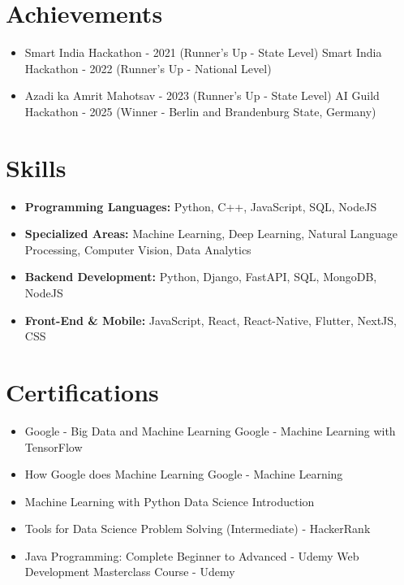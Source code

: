 \documentclass[a4paper,10pt]{article}
\begin{document}
\section*{Achievements}
\begin{itemize}
\item Smart India Hackathon - 2021 (Runner's Up - State Level) \hfill Smart India Hackathon - 2022 (Runner's Up - National Level)
\item Azadi ka Amrit Mahotsav - 2023 (Runner's Up - State Level) \hfill AI Guild Hackathon - 2025 (Winner - Berlin and Brandenburg State, Germany)
\end{itemize}

\section*{Skills}
\begin{itemize}
  \item \textbf{Programming Languages:} Python, C++, JavaScript, SQL, NodeJS
  \item \textbf{Specialized Areas:} Machine Learning, Deep Learning, Natural Language Processing, Computer Vision, Data Analytics
  \item \textbf{Backend Development:} Python, Django, FastAPI, SQL, MongoDB, NodeJS
  \item \textbf{Front-End \& Mobile:} JavaScript, React, React-Native, Flutter, NextJS, CSS
\end{itemize}

\section*{Certifications}
\begin{itemize}
\item Google - Big Data and Machine Learning \hfill Google - Machine Learning with TensorFlow
\item How Google does Machine Learning \hfill Google - Machine Learning
\item Machine Learning with Python \hfill Data Science Introduction
\item Tools for Data Science \hfill Problem Solving (Intermediate) - HackerRank
\item Java Programming: Complete Beginner to Advanced - Udemy \hfill Web Development Masterclass Course - Udemy
\end{itemize}
\end{document}
